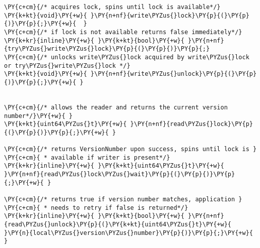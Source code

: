 \begin{Verbatim}[commandchars=\\\{\},codes={\catcode`\$=3\catcode`\^=7\catcode`\_=8\relax}]
\PY{c+cm}{/* acquires lock, spins until lock is available*/}
\PY{k+kt}{void}\PY{+w}{ }\PY{n+nf}{write\PYZus{}lock}\PY{p}{(}\PY{p}{)}\PY{p}{;}\PY{+w}{  }
\PY{c+cm}{/* if lock is not available returns false immediately*/}
\PY{k+kr}{inline}\PY{+w}{ }\PY{k+kt}{bool}\PY{+w}{ }\PY{n+nf}{try\PYZus{}write\PYZus{}lock}\PY{p}{(}\PY{p}{)}\PY{p}{;}
\PY{c+cm}{/* unlocks write\PYZus{}lock acquired by write\PYZus{}lock or try\PYZus{}write\PYZus{}lock */}
\PY{k+kt}{void}\PY{+w}{ }\PY{n+nf}{write\PYZus{}unlock}\PY{p}{(}\PY{p}{)}\PY{p}{;}\PY{+w}{ }


\PY{c+cm}{/* allows the reader and returns the current version number*/}\PY{+w}{ }
\PY{k+kt}{uint64\PYZus{}t}\PY{+w}{ }\PY{n+nf}{read\PYZus{}lock}\PY{p}{(}\PY{p}{)}\PY{p}{;}\PY{+w}{ }

\PY{c+cm}{/* returns VersionNumber upon success, spins until lock is }
\PY{c+cm}{ * available if writer is present*/}
\PY{k+kr}{inline}\PY{+w}{ }\PY{k+kt}{uint64\PYZus{}t}\PY{+w}{ }\PY{n+nf}{read\PYZus{}lock\PYZus{}wait}\PY{p}{(}\PY{p}{)}\PY{p}{;}\PY{+w}{ }

\PY{c+cm}{/* returns true if version number matches, application }
\PY{c+cm}{ * needs to retry if false is returned*/}
\PY{k+kr}{inline}\PY{+w}{ }\PY{k+kt}{bool}\PY{+w}{ }\PY{n+nf}{read\PYZus{}unlock}\PY{p}{(}\PY{k+kt}{uint64\PYZus{}t}\PY{+w}{ }\PY{n}{local\PYZus{}version\PYZus{}number}\PY{p}{)}\PY{p}{;}\PY{+w}{ }
\end{Verbatim}
